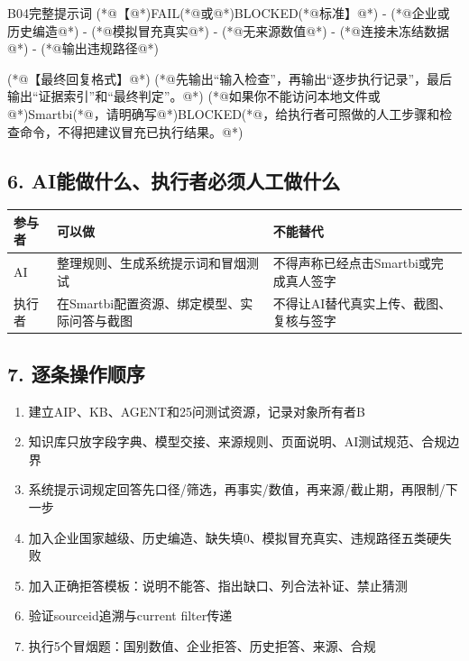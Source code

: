 \documentclass[UTF8,openany,zihao=-4]{ctexbook}
\renewcommand{\_}{\textunderscore\allowbreak}
\begin{document}
\begin{PromptBox}{B04完整提示词}
(*@{\promptcjk 【}@*)FAIL(*@{\promptcjk 或}@*)BLOCKED(*@{\promptcjk 标准】}@*)
- (*@{\promptcjk 企业或历史编造}@*)
- (*@{\promptcjk 模拟冒充真实}@*)
- (*@{\promptcjk 无来源数值}@*)
- (*@{\promptcjk 连接未冻结数据}@*)
- (*@{\promptcjk 输出违规路径}@*)

(*@{\promptcjk 【最终回复格式】}@*)
(*@{\promptcjk 先输出“输入检查”，再输出“逐步执行记录”，最后输出“证据索引”和“最终判定”。}@*)
(*@{\promptcjk 如果你不能访问本地文件或}@*)Smartbi(*@{\promptcjk ，请明确写}@*)BLOCKED(*@{\promptcjk ，给执行者可照做的人工步骤和检查命令，不得把建议冒充已执行结果。}@*)
\end{PromptBox}

\subsection*{6. AI能做什么、执行者必须人工做什么}
\noindent\begin{tabularx}{\textwidth}{@{}p{}XX@{}}
\toprule
\textbf{参与者} & \textbf{可以做} & \textbf{不能替代} \\
\midrule
AI & 整理规则、生成系统提示词和冒烟测试 & 不得声称已经点击Smartbi或完成真人签字 \\
执行者 & 在Smartbi配置资源、绑定模型、实际问答与截图 & 不得让AI替代真实上传、截图、复核与签字 \\
\bottomrule
\end{tabularx}

\subsection*{7. 逐条操作顺序}
\begin{enumerate}
\item 建立AIP、KB、AGENT和25问测试资源，记录对象所有者B
\item 知识库只放字段字典、模型交接、来源规则、页面说明、AI测试规范、合规边界
\item 系统提示词规定回答先口径/筛选，再事实/数值，再来源/截止期，再限制/下一步
\item 加入企业国家越级、历史编造、缺失填0、模拟冒充真实、违规路径五类硬失败
\item 加入正确拒答模板：说明不能答、指出缺口、列合法补证、禁止猜测
\item 验证source\_id追溯与current filter传递
\item 执行5个冒烟题：国别数值、企业拒答、历史拒答、来源、合规
\end{enumerate}
\end{document}

